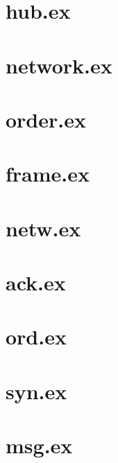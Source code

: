 \documentclass[a4paper,11pt]{article}
\begin{document}
\section{hub.ex} \label{app:hub}

\pagebreak

\section{network.ex} \label{app:net}

\pagebreak
\section{order.ex} \label{app:order}

\pagebreak
\section{frame.ex} \label{app:frame}

\section{netw.ex} \label{app:netw}

\section{ack.ex} \label{app:ack}

\section{ord.ex} \label{app:ord}

\section{syn.ex} \label{app:syn}

\section{msg.ex} \label{app:msg}

\end{document}

